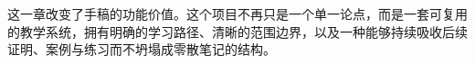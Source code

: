 \begin{summarybox}
这一章改变了手稿的功能价值。这个项目不再只是一个单一论点，而是一套可复用的教学系统，拥有明确的学习路径、清晰的范围边界，以及一种能够持续吸收后续证明、案例与练习而不坍塌成零散笔记的结构。
\end{summarybox}